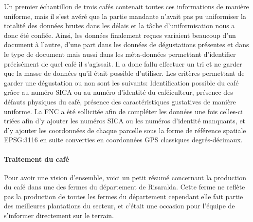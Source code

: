 \noindent Un premier échantillon de trois cafés contenait toutes ces informations de manière uniforme, mais il s'est avéré que la partie mandante n'avait pas pu uniformiser la totalité des données brutes dans les délais et la tâche d'uniformisation nous a donc été confiée. Ainsi, les données finalement reçues variaient beaucoup d'un document à l'autre, d'une part dans les données de dégustations présentes et dans le type de document mais aussi dans les méta-données permettant d'identifier précisément de quel café il s'agissait. Il a donc fallu effectuer un tri et ne garder que la masse de données qu'il était possible d'utiliser. Les critères permettant de garder une dégustation ou non sont les suivants: Identification possible du café grâce au numéro SICA ou au numéro d'identité du caféiculteur, présence des défauts physiques du café, présence des caractéristiques gustatives de manière uniforme. La FNC a été sollicitée afin de compléter les données une fois celles-ci triées afin d'y ajouter les numéros SICA ou les numéros d'identité manquants, et d'y ajouter les coordonnées de chaque parcelle sous la forme de référence spatiale EPSG:3116 en suite converties en coordonnées GPS classiques degrés-décimaux.\\

\paragraph{Traitement du café} Pour avoir une vision d'ensemble, voici un petit résumé concernant la production du café dans une des fermes du département de Risaralda. Cette ferme ne reflète pas la production de toutes les fermes du département cependant elle fait partie des meilleures plantations du secteur, et c'était une occasion pour l'équipe de s'informer directement sur le terrain. \\

